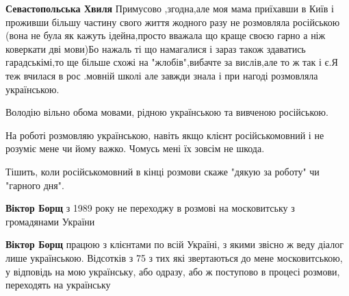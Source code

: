\begin{itemize}
\begin{itemize}
\textbf{Севастопольська Хвиля} Примусово ,згодна,але моя мама приїхавши в Київ
і проживши більшу частину свого життя жодного разу не розмовляла російською
(вона не була як кажуть ідейна,просто вважала що краще своєю гарно а ніж
коверкати дві мови)Бо нажаль ті що намагалися і зараз також здаватись
гарадськімі,то ще більше схожі на "жлобів",вибачте за вислів,але то ж так і є.Я
теж вчилася в рос .мовній школі але завжди знала і при нагоді розмовляла
українською.
\end{itemize}

 

Володію вільно обома мовами, рідною українською та вивченою російською.

На роботі розмовляю українською, навіть якщо клієнт російськомовний і не
розуміє мене чи йому важко. Чомусь мені їх зовсім не шкода.

Тішить, коли російськомовний в кінці розмови скаже "дякую за роботу" чи
"гарного дня".

\begin{itemize}
 
\textbf{Віктор Борщ} з 1989 року не переходжу в розмові на московитську з громадянами України

 
\textbf{Віктор Борщ} працюю з клієнтами по всій Україні, з якими звісно ж веду діалог лише українською. Відсотків з 75 з тих які звертаються до мене московитською, у відповідь на мою українську, або одразу, або ж поступово в процесі розмови, переходять на українську

 

\end{itemize}
\end{itemize}
